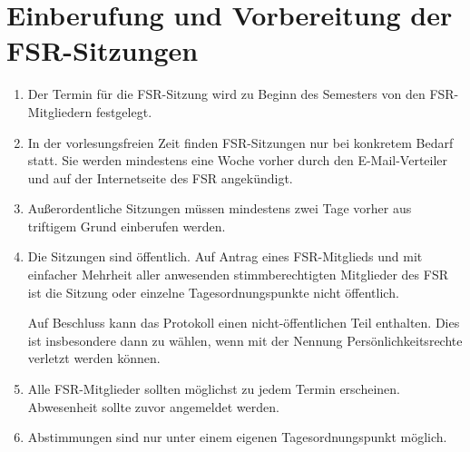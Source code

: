 \documentclass[
	a4paper,
	12pt,
	oneside,
	parskip=half-,
	pagesize,
	headsepline,
	german,
	ngerman
]{scrartcl}
\begin{document}
\section{Einberufung und Vorbereitung der FSR-Sitzungen} \label{sec:Sitzung-A}
\begin{enumerate}
	\item Der Termin für die FSR-Sitzung wird zu Beginn des Semesters von den FSR-Mitgliedern festgelegt.
	\item In der vorlesungsfreien Zeit finden FSR-Sitzungen nur bei konkretem Bedarf statt. Sie werden mindestens eine Woche vorher durch den E-Mail-Verteiler und auf der Internetseite des FSR angekündigt.
	\item Außerordentliche Sitzungen müssen mindestens zwei Tage vorher aus triftigem Grund einberufen werden. 
	\item Die Sitzungen sind öffentlich. Auf Antrag eines FSR-Mitglieds und mit einfacher Mehrheit aller anwesenden stimmberechtigten Mitglieder des FSR ist die Sitzung oder einzelne Tagesordnungspunkte nicht öffentlich.
	
	Auf Beschluss kann das Protokoll einen nicht-öffentlichen Teil enthalten. Dies ist insbesondere dann zu wählen, wenn mit der Nennung Persönlichkeitsrechte verletzt werden können.
	\item Alle FSR-Mitglieder sollten möglichst zu jedem Termin erscheinen. Abwesenheit sollte zuvor angemeldet werden.
	\item Abstimmungen sind nur unter einem eigenen Tagesordnungspunkt möglich.
\end{enumerate}
\end{document}
